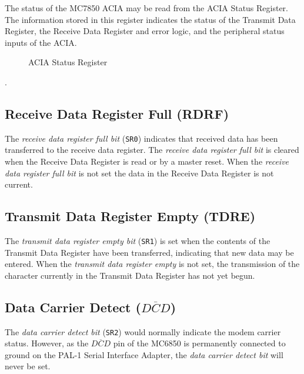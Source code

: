 \documentclass[a4paper,11pt,twoside,openright]{report}
\renewcommand{\arraystretch}{1.1}
\newcommand{\code}{\texttt}
\begin{document}
The status of the MC7850 ACIA may be read from the ACIA Status Register. The information stored in this register indicates the status of the Transmit Data Register, the Receive Data Register and error logic, and the peripheral status inputs of the ACIA.

\begin{figure}[H]
\renewcommand{\arraystretch}{1.2}
\centering
{}
\caption{ACIA Status Register}
\end{figure}.

\subsection*{Receive Data Register Full (RDRF)}
The \textit{receive data register full bit} (\code{SR0}) indicates that received data has been transferred to the receive data register. The \textit{receive data register full bit} is cleared when the Receive Data Register is read or by a master reset. When the \textit{receive data register full bit} is not set the data in the Receive Data Register is not current.

\subsection*{Transmit Data Register Empty (TDRE)}
The \textit{transmit data register empty bit} (\code{SR1}) is set when the contents of the Transmit Data Register have been transferred, indicating that new data may be entered. When the \textit{transmit data register empty} is not set, the transmission of the character currently in the Transmit Data Register has not yet begun.

\subsection*{Data Carrier Detect ($\overline{DCD}$)}
The \textit{data carrier detect bit} (\code{SR2}) would normally indicate the modem carrier status. However, as the $\overline{DCD}$ pin of the MC6850 is permanently connected to ground on the PAL-1 Serial Interface Adapter,  the \textit{data carrier detect bit} will never be set.
\end{document}
